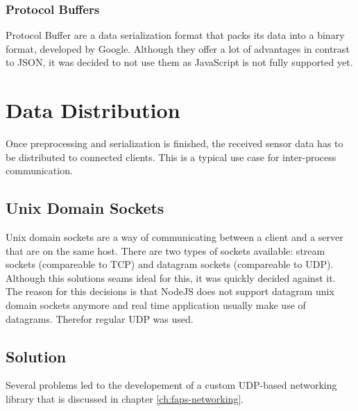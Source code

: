 \subsubsection{Protocol Buffers}

Protocol Buffer are a data serialization format that packs its data into a binary format, developed by Google. Although they offer a lot of advantages in contrast to JSON, it was decided to not use them as JavaScript is not fully supported yet.


\section{Data Distribution}

Once preprocessing and serialization is finished, the received sensor data has to be distributed to connected clients. This is a typical use case for inter-process communication.

\subsection{Unix Domain Sockets}

Unix domain sockets are a way of communicating between a client and a server that are on the same host. There are two types of sockets available: stream sockets (compareable to TCP) and datagram sockets (compareable to
UDP). Although this solutions seams ideal for this, it was quickly decided against it. The reason for this decisions is that NodeJS does not support datagram unix domain sockets anymore and real time application usually
make use of datagrams. Therefor regular UDP was used.

\subsection{Solution}

Several problems led to the developement of a custom UDP-based networking library that is discussed in chapter \ref{ch:faps-networking}.
